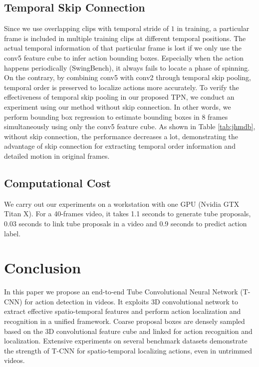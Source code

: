 \documentclass[10pt,twocolumn,letterpaper]{article}
\begin{document}
\subsection{Temporal Skip Connection}
Since we use overlapping clips with temporal stride of $1$ in training, a particular frame is included in multiple training clips at different temporal positions. The actual temporal information of that particular frame is lost if we only use the conv5 feature cube to infer action bounding boxes. Especially when the action happens periodically (\ie SwingBench), it always fails to locate a phase of spinning. On the contrary, by combining conv5 with conv2 through temporal skip pooling, temporal order is preserved to localize actions more accurately. To verify the effectiveness of temporal skip pooling in our proposed TPN, we conduct an experiment using our method without skip connection. In other words, we perform bounding box regression to estimate bounding boxes in 8 frames simultaneously using only the conv5 feature cube. As shown in Table \ref{tab:jhmdb}, without skip connection, the performance decreases a lot, demonstrating the advantage of skip connection for extracting temporal order information and detailed motion in original frames.




\subsection{Computational Cost}
We carry out our experiments on a workstation with one GPU (Nvidia GTX Titan X). For a 40-frames video, it takes 1.1 seconds to generate tube proposals, 0.03 seconds to link tube proposals in a video and 0.9 seconds to predict action label.


\section{Conclusion}
\label{sec:conclusion}
In this paper we propose an end-to-end Tube Convolutional Neural Network (T-CNN) for action detection in videos. It exploits 3D convolutional network to extract effective spatio-temporal features and perform action localization and recognition in a unified framework. Coarse proposal boxes are densely sampled based on the 3D convolutional feature cube and linked for action recognition and localization.  Extensive experiments on several benchmark datasets demonstrate the strength of T-CNN for spatio-temporal localizing actions, even in untrimmed videos.
\end{document}
